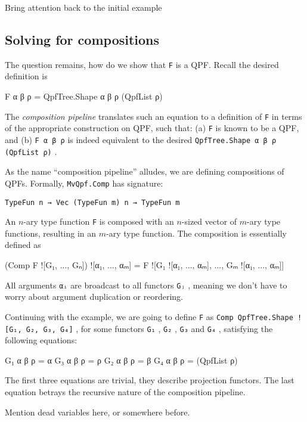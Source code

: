 \documentclass[titlepage]{report}
\newenvironment{todo}{%
\definecolor{shadecolor}{HTML}{F8E0E0}%
\begin{shaded}%
\begin{trivlist}                         
    \item[\hskip \labelsep {\bfseries Todo:}]}{\end{trivlist}\end{shaded}}
\newcommand\lean[1]{{%
\def\leanmode{1}%
\small \texttt{#1}%
\undef\leanmode%
}}
\begin{document}
\begin{todo}
    Bring attention back to the initial example
\end{todo}


\subsection{Solving for compositions}

The question remains, how do we show that \lean{F} is a QPF.
Recall the desired definition is
\begin{leancode}
    F α β ρ = QpfTree.Shape α β ρ (QpfList ρ)
\end{leancode}

The \emph{composition pipeline} translates such an equation to a definition of \lean{F} in terms of the appropriate construction on QPF, such that: (a) \lean{F} is known to be a QPF, and (b) \lean{F α β ρ} is indeed equivalent to the desired \lean{QpfTree.Shape α β ρ (QpfList ρ)}.

As the name ``composition pipeline'' alludes, we are defining compositions of QPFs. Formally, \lean{MvQpf.Comp} has signature:
\begin{center}
    \lean{TypeFun n → Vec (TypeFun m) n → TypeFun m}
\end{center}
An $n$-ary type function \lean{F} is composed with an $n$-sized vector of $m$-ary type functions, resulting in an $m$-ary type function. The composition is essentially defined as
\begin{leancode}
    (Comp F ![G₁, ..., Gₙ]) ![α₁, ..., αₘ] 
                = F ![G₁ ![α₁, ..., αₘ], ..., Gₘ ![α₁, ..., αₘ]]
\end{leancode}
All arguments \lean{αᵢ} are broadcast to all functors \lean{Gⱼ}, meaning we don't have to worry about argument duplication or reordering.

Continuing with the example, we are going to define \lean{F} as \lean{Comp QpfTree.Shape ![G₁, G₂, G₃, G₄]}, for some functors \lean{G₁}, \lean{G₂}, \lean{G₃} and \lean{G₄}, satisfying the following equations:
\begin{leancode}
    G₁ α β ρ = α                G₃ α β ρ = ρ
    G₂ α β ρ = β                G₄ α β ρ = (QpfList ρ)
\end{leancode}
The first three equations are trivial, they describe projection functors. 
The last equation betrays the recursive nature of the composition pipeline.

\begin{todo}
    Mention dead variables here, or somewhere before.
\end{todo}
\end{document}
